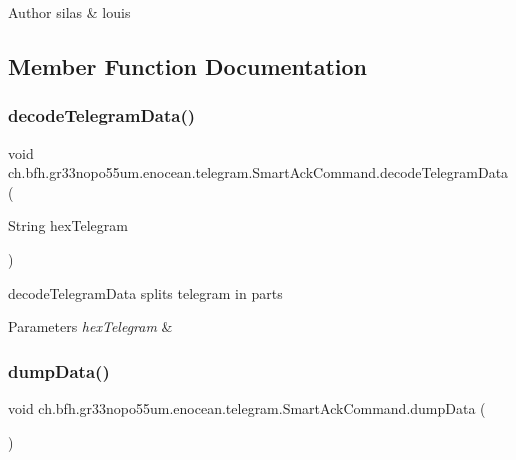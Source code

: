 \begin{DoxyAuthor}{Author}
silas \& louis 
\end{DoxyAuthor}


\subsection{Member Function Documentation}
\hypertarget{classch_1_1bfh_1_1gr33nopo55um_1_1enocean_1_1telegram_1_1_smart_ack_command_a09d57332bda75a1af7f352b8af15620a}{}\label{classch_1_1bfh_1_1gr33nopo55um_1_1enocean_1_1telegram_1_1_smart_ack_command_a09d57332bda75a1af7f352b8af15620a} 
\subsubsection{\texorpdfstring{decode\+Telegram\+Data()}{decodeTelegramData()}}
{\footnotesize\ttfamily void ch.\+bfh.\+gr33nopo55um.\+enocean.\+telegram.\+Smart\+Ack\+Command.\+decode\+Telegram\+Data (\begin{DoxyParamCaption}\item[{String}]{hex\+Telegram }\end{DoxyParamCaption})}

decode\+Telegram\+Data splits telegram in parts


\begin{DoxyParams}{Parameters}
{\em hex\+Telegram} & \\
\hline
\end{DoxyParams}
\hypertarget{classch_1_1bfh_1_1gr33nopo55um_1_1enocean_1_1telegram_1_1_smart_ack_command_ad9c443c462ce590c1f8c1fb81b30f9ec}{}\label{classch_1_1bfh_1_1gr33nopo55um_1_1enocean_1_1telegram_1_1_smart_ack_command_ad9c443c462ce590c1f8c1fb81b30f9ec} 
\subsubsection{\texorpdfstring{dump\+Data()}{dumpData()}}
{\footnotesize\ttfamily void ch.\+bfh.\+gr33nopo55um.\+enocean.\+telegram.\+Smart\+Ack\+Command.\+dump\+Data (\begin{DoxyParamCaption}{ }\end{DoxyParamCaption})}

